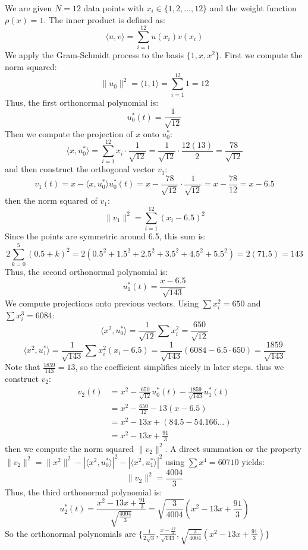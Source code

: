 \documentclass[a4paper]{article}
\begin{document}
We are given $N=12$ data points with $x_i \in \{1, 2, \dots, 12\}$ and the weight function $\rho(x) = 1$. The inner product is defined as:
\begin{equation}
    \langle u, v \rangle = \sum_{i=1}^{12} u(x_i) v(x_i)
\end{equation}
We apply the Gram-Schmidt process to the basis $\{1, x, x^2\}$. First we compute the norm squared:
\[ \|u_0\|^2 = \langle 1, 1 \rangle = \sum_{i=1}^{12} 1 = 12 \]
Thus, the first orthonormal polynomial is:
\begin{equation}
    u_0^*(t) = \frac{1}{\sqrt{12}}
\end{equation}
Then we compute the projection of $x$ onto $u_0^*$:
\[ \langle x, u_0^* \rangle = \sum_{i=1}^{12} x_i \cdot \frac{1}{\sqrt{12}} = \frac{1}{\sqrt{12}} \cdot \frac{12(13)}{2} = \frac{78}{\sqrt{12}} \]
and then construct the orthogonal vector $v_1$:
\[ v_1(t) = x - \langle x, u_0^* \rangle u_0^*(t) = x - \frac{78}{\sqrt{12}} \cdot \frac{1}{\sqrt{12}} = x - \frac{78}{12} = x - 6.5 \]
then the norm squared of $v_1$:
\[ \|v_1\|^2 = \sum_{i=1}^{12} (x_i - 6.5)^2 \]
Since the points are symmetric around 6.5, this sum is:
\[ 2 \sum_{k=0}^{5} (0.5 + k)^2 = 2 (0.5^2 + 1.5^2 + 2.5^2 + 3.5^2 + 4.5^2 + 5.5^2) = 2(71.5) = 143 \]
Thus, the second orthonormal polynomial is:
\begin{equation}
    u_1^*(t) = \frac{x - 6.5}{\sqrt{143}}
\end{equation}
We compute projections onto previous vectors. Using $\sum x_i^2 = 650$ and $\sum x_i^3 = 6084$:
\[ \langle x^2, u_0^* \rangle = \frac{1}{\sqrt{12}} \sum x_i^2 = \frac{650}{\sqrt{12}} \]
\[ \langle x^2, u_1^* \rangle = \frac{1}{\sqrt{143}} \sum x_i^2(x_i - 6.5) = \frac{1}{\sqrt{143}} (6084 - 6.5 \cdot 650) = \frac{1859}{\sqrt{143}} \]
Note that $\frac{1859}{143} = 13$, so the coefficient simplifies nicely in later steps. thus we construct $v_2$:
\begin{align*}
    v_2(t) &= x^2 - \frac{650}{\sqrt{12}} u_0^*(t) - \frac{1859}{\sqrt{143}} u_1^*(t) \\
           &= x^2 - \frac{650}{12} - 13(x - 6.5) \\
           &= x^2 - 13x + (84.5 - 54.166\dots) \\
           &= x^2 - 13x + \frac{91}{3}
\end{align*}
then we compute the norm squared $\|v_2\|^2$. A direct summation or the property $\|v_2\|^2 = \|x^2\|^2 - |\langle x^2, u_0^* \rangle|^2 - |\langle x^2, u_1^* \rangle|^2$ using $\sum x^4 = 60710$ yields:
\[ \|v_2\|^2 = \frac{4004}{3} \]
Thus, the third orthonormal polynomial is:
\begin{equation}
    u_2^*(t) = \frac{x^2 - 13x + \frac{91}{3}}{\sqrt{\frac{4004}{3}}}=\sqrt{\frac{3}{4004}}(x^2 - 13x + \frac{91}{3})
\end{equation}
So the orthonormal polynomials are $\{\frac{1}{2\sqrt{3}},\frac{x-\frac{13}{2}}{\sqrt{143}},\sqrt{\frac{3}{4004}}(x^2 - 13x + \frac{91}{3})\}$
\end{document}
